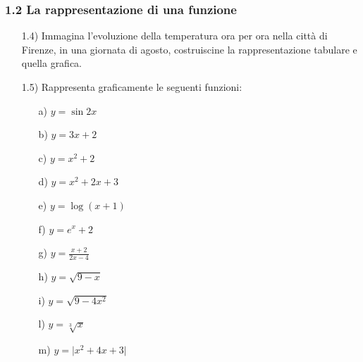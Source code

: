 \subsubsection*{1.2 La rappresentazione di una funzione}
\begin{itemize}
  \item[1.4)] Immagina l'evoluzione della temperatura ora per ora nella 
città di Firenze, in una giornata di agosto, costruiscine la rappresentazione 
tabulare e quella grafica.
  \item[1.5)] Rappresenta graficamente le seguenti funzioni:
  \begin{itemize}
  \item[a)] $y=\sin2x$
  \item[b)] $y=3x+2$
  \item[c)] $y=x^2+2$
  \item[d)] $y=x^2+2x+3$
  \item[e)] $y=\log{(x+1)}$
  \item[f)] $y=e^x+2$
  \item[g)] $y=\frac{x+2}{2x-4}$
  \item[h)] $y=\sqrt{9-x}$
  \item[i)] $y=\sqrt{9-4x^2}$
  \item[l)] $y=\sqrt[3]{x}$
  \item[m)] $y=\vert x^2+4x+3\vert$
  \end{itemize}
\end{itemize}

